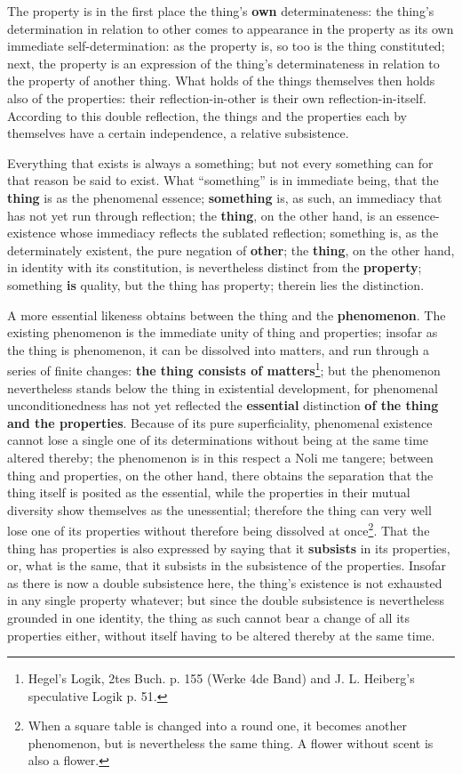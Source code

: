 \documentclass[12pt,a4paper,openany]{book}
\newcommand{\opage}[1]{\marginnote{\footnotesize\textit{[#1]}}}
\begin{document}
The property is in the first place the thing's \textbf{own} determinateness:
the thing's determination in relation to other
comes to appearance in the property as its own immediate
self-determination: as the property is, so too
is the thing constituted; next, the property is an expression
of the thing's determinateness in relation to the property of another
thing. What holds of the things themselves
then holds also of the properties: their reflection-in-other
is their own reflection-in-itself. According to this
double reflection, the things and the properties each
by themselves have a certain independence, a relative subsistence.

Everything that exists is always a something; but not every
something can for that reason be said to exist. What ``something''
is in immediate being, that the \textbf{thing} is as
the phenomenal essence; \textbf{something} is, as such, an
immediacy that has not yet run through reflection;
the \textbf{thing}, on the other hand, is an essence-existence whose
immediacy reflects the sublated reflection; something is, as the determinately existent, the pure negation of
\textbf{other}; the \textbf{thing}, on the other hand, in identity with its
constitution, is nevertheless distinct from the \textbf{property};
something \textbf{is} quality, but the thing has property; therein
lies the distinction.

A more essential likeness obtains between the thing
and the \textbf{phenomenon}. The existing phenomenon
is the immediate unity of thing and properties;
insofar as the thing is phenomenon, it can be dissolved into
matters, and run through a series of finite
\setcounter{footnote}{0}%
\opage{173}changes: \textbf{the thing consists of matters}\footnote{Hegel's Logik, 2tes Buch. p. 155 (Werke 4de Band) and J. L. Heiberg's speculative Logik p. 51.}; but the phenomenon
nevertheless stands below the thing in existential development,
for phenomenal unconditionedness has not yet
reflected the \textbf{essential} distinction \textbf{of the thing and the properties}.
Because of its pure superficiality,
phenomenal existence cannot lose a
single one of its determinations without being at the same time
altered thereby; the phenomenon is in this respect a Noli
me tangere; between thing and properties, on the other hand,
there obtains the separation that the thing itself is posited as
the essential, while the properties in their mutual
diversity show themselves as the unessential; therefore
the thing can very well lose one of its properties without
therefore being dissolved at once\footnote{When a square table is changed into a round one, it becomes another phenomenon, but is nevertheless the same thing. A flower without scent is also a flower.}. That the thing has properties
is also expressed by saying that it \textbf{subsists} in its
properties, or, what is the same, that it subsists
in the subsistence of the properties. Insofar as there is now
a double subsistence here, the thing's existence is not
exhausted in any single property whatever; but since the double
subsistence is nevertheless grounded in one identity,
the thing as such cannot bear a change
of all its properties either, without itself having to be
altered thereby at the same time.
\end{document}
